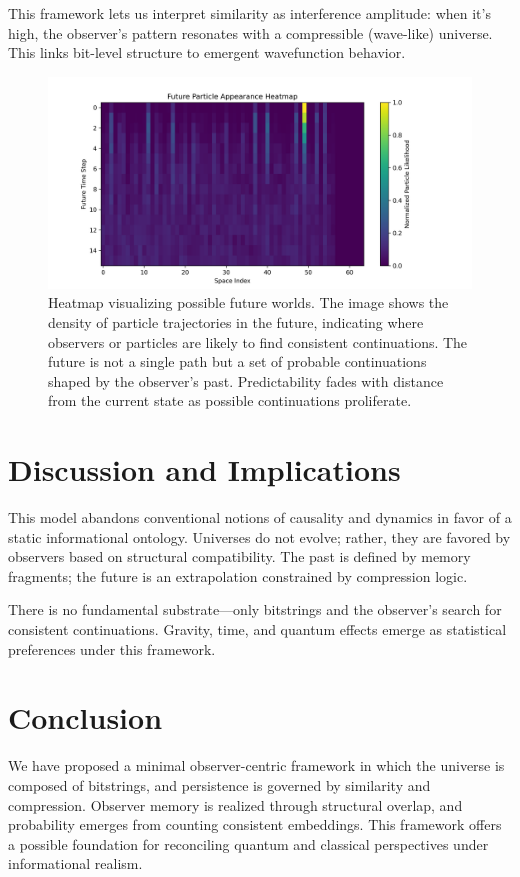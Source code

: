 \documentclass[12pt]{article}
\begin{document}
This framework lets us interpret similarity as interference amplitude: when it's high, the observer's pattern resonates with a compressible (wave-like) universe. This links bit-level structure to emergent wavefunction behavior.

\begin{figure}[h!]
    \centering
    \includegraphics[width=1.0\textwidth]{figures/future_particle_heatmap.png}
    \caption{Heatmap visualizing possible future worlds. The image shows the density of particle trajectories in the future, indicating where observers or particles are likely to find consistent continuations. The future is not a single path but a set of probable continuations shaped by the observer's past. Predictability fades with distance from the current state as possible continuations proliferate.}
    \label{fig:average_universe_heatmap}
\end{figure}

\section{Discussion and Implications}

This model abandons conventional notions of causality and dynamics in favor of a static informational ontology. Universes do not evolve; rather, they are favored by observers based on structural compatibility. The past is defined by memory fragments; the future is an extrapolation constrained by compression logic.

There is no fundamental substrate—only bitstrings and the observer's search for consistent continuations. Gravity, time, and quantum effects emerge as statistical preferences under this framework.

\section{Conclusion}

We have proposed a minimal observer-centric framework in which the universe is composed of bitstrings, and persistence is governed by similarity and compression. Observer memory is realized through structural overlap, and probability emerges from counting consistent embeddings. This framework offers a possible foundation for reconciling quantum and classical perspectives under informational realism.
\end{document}
